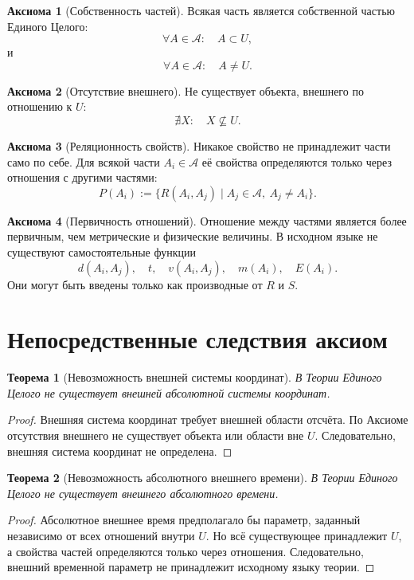 \documentclass[12pt,a4paper,oneside]{book}
\theoremstyle{definition}
\newtheorem{axiom}{Аксиома}[chapter]
\theoremstyle{plain}
\newtheorem{theorem}{Теорема}[chapter]
\theoremstyle{remark}
\newcommand{\Whole}{U}
\newcommand{\Parts}{\mathcal A}
\newcommand{\Rel}{R}
\newcommand{\State}{S}
\begin{document}
\begin{axiom}[Собственность частей]
Всякая часть является собственной частью Единого Целого:
\[
\forall A \in \Parts:\quad A \subset \Whole,
\]
и
\[
\forall A \in \Parts:\quad A \neq \Whole.
\]
\end{axiom}

\begin{axiom}[Отсутствие внешнего]
Не существует объекта, внешнего по отношению к \(\Whole\):
\[
\nexists X:\quad X \not\subseteq \Whole.
\]
\end{axiom}

\begin{axiom}[Реляционность свойств]
Никакое свойство не принадлежит части само по себе. Для всякой части \(A_i \in \Parts\) её свойства определяются только через отношения с другими частями:
\[
P(A_i) := \{\Rel(A_i,A_j) \mid A_j \in \Parts,\ A_j \neq A_i\}.
\]
\end{axiom}

\begin{axiom}[Первичность отношений]
Отношение между частями является более первичным, чем метрические и физические величины. В исходном языке не существуют самостоятельные функции
\[
d(A_i,A_j),\quad t,\quad v(A_i,A_j),\quad m(A_i),\quad E(A_i).
\]
Они могут быть введены только как производные от \(\Rel\) и \(\State\).
\end{axiom}

\section{Непосредственные следствия аксиом}

\begin{theorem}[Невозможность внешней системы координат]
В Теории Единого Целого не существует внешней абсолютной системы координат.
\end{theorem}

\begin{proof}
Внешняя система координат требует внешней области отсчёта. По Аксиоме отсутствия внешнего не существует объекта или области вне \(\Whole\). Следовательно, внешняя система координат не определена.
\end{proof}

\begin{theorem}[Невозможность абсолютного внешнего времени]
В Теории Единого Целого не существует внешнего абсолютного времени.
\end{theorem}

\begin{proof}
Абсолютное внешнее время предполагало бы параметр, заданный независимо от всех отношений внутри \(\Whole\). Но всё существующее принадлежит \(\Whole\), а свойства частей определяются только через отношения. Следовательно, внешний временной параметр не принадлежит исходному языку теории.
\end{proof}
\end{document}
